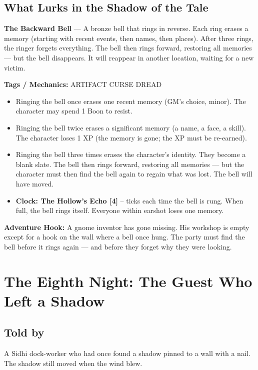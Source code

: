 \documentclass[10pt,twoside]{book}
\newcommand{\tag}[1]{\textsc{#1}}
\begin{document}
\section*{What Lurks in the Shadow of the Tale}
\begin{infobox}
\textbf{The Backward Bell} --- A bronze bell that rings in reverse. Each ring erases a memory (starting with recent events, then names, then places). After three rings, the ringer forgets everything. The bell then rings forward, restoring all memories --- but the bell disappears. It will reappear in another location, waiting for a new victim.

\textbf{Tags / Mechanics:} \tag{ARTIFACT} \tag{CURSE} \tag{DREAD}

\begin{itemize}
\item Ringing the bell once erases one recent memory (GM's choice, minor). The character may spend 1 Boon to resist.
\item Ringing the bell twice erases a significant memory (a name, a face, a skill). The character loses 1 XP (the memory is gone; the XP must be re-earned).
\item Ringing the bell three times erases the character's identity. They become a blank slate. The bell then rings forward, restoring all memories --- but the character must then find the bell again to regain what was lost. The bell will have moved.
\item \textbf{Clock: The Hollow's Echo [4]} -- ticks each time the bell is rung. When full, the bell rings itself. Everyone within earshot loses one memory.
\end{itemize}

\textbf{Adventure Hook:} A gnome inventor has gone missing. His workshop is empty except for a hook on the wall where a bell once hung. The party must find the bell before it rings again --- and before they forget why they were looking.
\end{infobox}

\chapter{The Eighth Night: The Guest Who Left a Shadow}

\section*{Told by}
A Sidhi dock-worker who had once found a shadow pinned to a wall with a nail. The shadow still moved when the wind blew.
\end{document}
